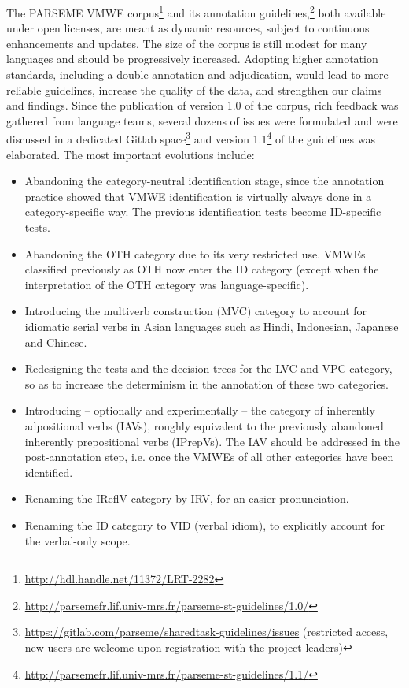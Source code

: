 \documentclass[output=paper,
modfonts,
]{langscibook}
\begin{document}
%
The PARSEME VMWE corpus\footnote{\url{http://hdl.handle.net/11372/LRT-2282}} and its annotation guidelines,\footnote{\url{http://parsemefr.lif.univ-mrs.fr/parseme-st-guidelines/1.0/}} both available under open licenses, are meant as dynamic resources, subject to continuous enhancements and updates. 
The size of the corpus is still modest for many languages and should be progressively increased. Adopting higher annotation standards, including a double annotation and adjudication, would lead to more reliable guidelines, increase the quality of the data, and strengthen our claims and findings. Since the publication of version 1.0 of the corpus, rich feedback was gathered from language teams, several dozens of issues were formulated and were discussed in a dedicated Gitlab space\footnote{\url{https://gitlab.com/parseme/sharedtask-guidelines/issues} (restricted access, new users are welcome upon registration with the project leaders)} and version 1.1\footnote{\url{http://parsemefr.lif.univ-mrs.fr/parseme-st-guidelines/1.1/}} of the guidelines was elaborated. The most important evolutions include:
\begin{itemize}
\item Abandoning the category-neutral identification stage, since the annotation practice showed that VMWE identification is virtually always done in a category-specific way. The previous identification tests become ID-specific tests.
\item Abandoning the OTH category due to its very restricted use. VMWEs classified previously as OTH now enter the ID category (except when the interpretation of the OTH category was language-specific).
\item Introducing the multiverb construction (MVC) category to account for idiomatic serial verbs in Asian languages such as Hindi, Indonesian, Japanese and Chinese.
\item Redesigning the tests and the decision trees for the LVC and VPC category, so as to increase the determinism in the annotation of these two categories.
\item Introducing -- optionally and experimentally -- the category of inherently adpositional verbs (IAVs), roughly equivalent to the previously abandoned inherently prepositional verbs (IPrepVs).  The IAV should be addressed in the post-annotation step, i.e. once the VMWEs of all other categories have been identified.
\item Renaming the IReflV category by IRV, for an easier pronunciation.
\item Renaming the ID category to VID (verbal idiom), to explicitly account for the verbal-only scope.
\end{itemize}
\end{document}
